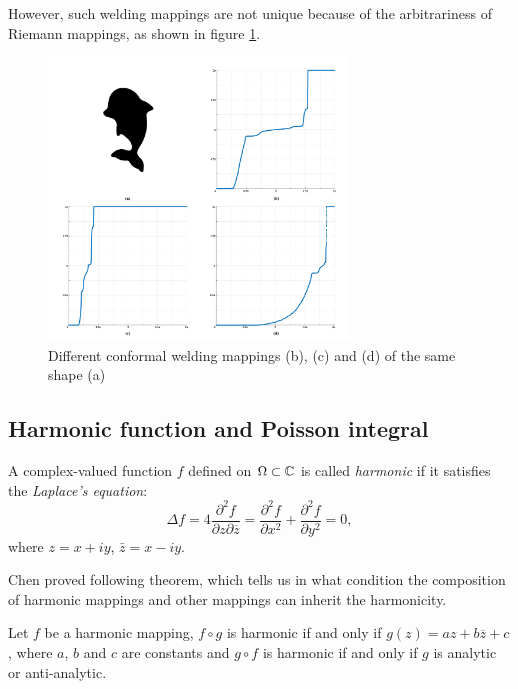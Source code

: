 \documentclass[review,onefignum,onetabnum]{siamonline190516}
\begin{document}
        However, such welding mappings are not unique because of the arbitrariness of Riemann mappings, as shown in figure \ref{unsatble}.
        
        \begin{figure}
            \begin{center}
                \includegraphics[width=8cm]{unstable_welding.png}
            \end{center}
            \caption{Different conformal welding mappings (b), (c) and (d) of the same shape (a)}
            \label{unsatble}
        \end{figure}

    \subsection{Harmonic function and Poisson integral}
        A complex-valued function $f$ defined on $\Omega \subset \mathbb{C}$ is called \textit{harmonic} if it satisfies the \textit{Laplace's equation}:
        \begin{equation}
            \Delta f = 4 \frac{\partial^2 f}{\partial z \partial \overline{z}} = \frac{\partial^2 f}{\partial x^2} + \frac{\partial^2 f}{\partial y^2} = 0,
        \end{equation}
        where $z = x + iy$, $\bar{z} = x -iy$.

        Chen \etal \cite{chen2010compositions} proved following theorem, which tells us in what condition the composition of harmonic mappings and other mappings can inherit the harmonicity.
        \begin{theorem}\label{composition of harmonic}
            Let $f$ be a harmonic mapping, $f \circ g$ is harmonic if and only if $g(z) = az + b \overline{z} + c$, where $a$, $b$ and $c$ are constants and $g \circ f$ is harmonic if and only if $g$ is analytic or anti-analytic.
        \end{theorem}
        
\end{document}
